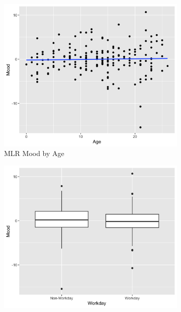\documentclass[12pt,twoside,letterpaper]{article}
\theoremstyle{definition}
\theoremstyle{definition}
\begin{document}
                \begin{figure} 
                    \centering
                    \begin{subfigure}[b]{0.32\textwidth}
                    \centering
                    \includegraphics[width=\textwidth]{pics/mlr mood by age.png}
                    \caption[]%
                    {{\small MLR Mood by Age}}
                    \label{fig: mood v age}
                    \end{subfigure}
                    \hfill
                    \begin{subfigure}[b]{0.32\textwidth}
                    \centering
                    \includegraphics[width=\textwidth]{pics/mlr mood by day.png}

\end{subfigure}
\end{figure}
\end{document}
